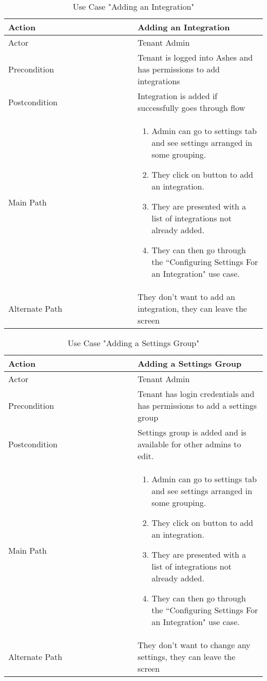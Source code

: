 \documentclass[11pt]{article}
\newcommand\tabularhead[1]{
\begin{table}[h]
    \caption{Use Case "#1"}
  \begin{tabular}{|p{0.5\linewidth}|p{0.66\linewidth}|}
    \hline
    \textbf{Action} & \textbf{#1} \\
    \hline}
\newcommand\addrow[2]{#1 &#2\\ \hline}
\newcommand\addmulrow[2]{ \begin{minipage}[t][][t]{2.5cm}#1\end{minipage}%
     &\begin{minipage}[t][][t]{8cm}
      \begin{enumerate} #2   \end{enumerate}
      \end{minipage}\\ }
\newenvironment{usecase}{\tabularhead}
{\hline\end{tabular}\end{table}}
\begin{document}
\begin{usecase}{Adding an Integration}
    \addrow{Actor}{Tenant Admin}
    \addrow{Precondition}{Tenant is logged into Ashes and has permissions to add integrations}
    \addrow{Postcondition}{Integration is added if successfully goes through flow}
    \addmulrow{Main Path}{
        \item Admin can go to settings tab and see settings arranged in some grouping.
        \item They click on button to add an integration.
        \item They are presented with a list of integrations not already added.
        \item They can then go through the ``Configuring Settings For an Integration" use case.
     }
    \addrow{Alternate Path}{They don't want to add an integration, they can leave the screen}
\end{usecase}

\begin{usecase}{Adding a Settings Group}
    \addrow{Actor}{Tenant Admin}
    \addrow{Precondition}{Tenant has login credentials and has permissions to add a settings group}
    \addrow{Postcondition}{Settings group is added and is available for other admins to edit.}
    \addmulrow{Main Path}{
        \item Admin can go to settings tab and see settings arranged in some grouping.
        \item They click on button to add an integration.
        \item They are presented with a list of integrations not already added.
        \item They can then go through the ``Configuring Settings For an Integration" use case.
     }
    \addrow{Alternate Path}{They don't want to change any settings, they can leave the screen}
\end{usecase}
\end{document}
